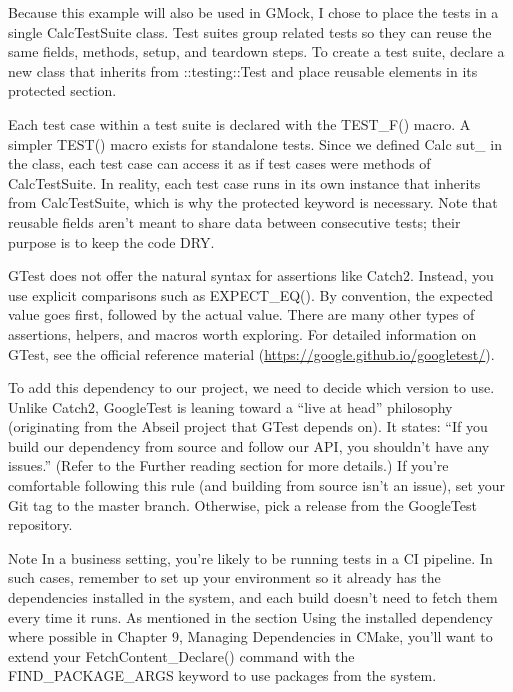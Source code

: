 Because this example will also be used in GMock, I chose to place the tests in a single CalcTestSuite class. Test suites group related tests so they can reuse the same fields, methods, setup, and teardown steps. To create a test suite, declare a new class that inherits from ::testing::Test and place reusable elements in its protected section.

Each test case within a test suite is declared with the TEST\_F() macro. A simpler TEST() macro exists for standalone tests. Since we defined Calc sut\_ in the class, each test case can access it as if test cases were methods of CalcTestSuite. In reality, each test case runs in its own instance that inherits from CalcTestSuite, which is why the protected keyword is necessary. Note that reusable fields aren’t meant to share data between consecutive tests; their purpose is to keep the code DRY.

GTest does not offer the natural syntax for assertions like Catch2. Instead, you use explicit comparisons such as EXPECT\_EQ(). By convention, the expected value goes first, followed by the actual value. There are many other types of assertions, helpers, and macros worth exploring. For detailed information on GTest, see the official reference material (\url{https://google.github.io/googletest/}).

To add this dependency to our project, we need to decide which version to use. Unlike Catch2, GoogleTest is leaning toward a “live at head” philosophy (originating from the Abseil project that GTest depends on). It states: “If you build our dependency from source and follow our API, you shouldn’t have any issues.” (Refer to the Further reading section for more details.) If you’re comfortable following this rule (and building from source isn’t an issue), set your Git tag to the master branch. Otherwise, pick a release from the GoogleTest repository.

\begin{myNotic}{Note}
In a business setting, you’re likely to be running tests in a CI pipeline. In such cases, remember to set up your environment so it already has the dependencies installed in the system, and each build doesn’t need to fetch them every time it runs. As mentioned in the section Using the installed dependency where possible in Chapter 9, Managing Dependencies in CMake, you’ll want to extend your FetchContent\_Declare() command with the FIND\_PACKAGE\_ARGS keyword to use packages from the system.
\end{myNotic}


